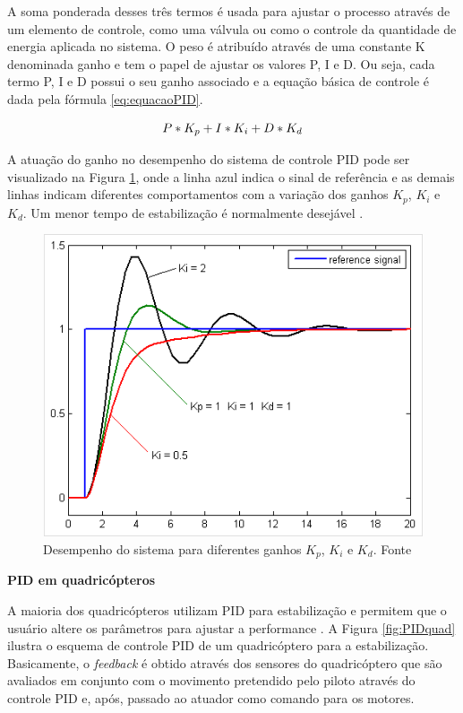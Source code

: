 \documentclass[a4paper, 12pt]{article}
\begin{document}
A soma ponderada desses três termos é usada para ajustar o processo através de um elemento de controle, como uma válvula ou como o controle da quantidade de energia aplicada no sistema. O peso é atribuído através de uma constante K denominada ganho e tem o papel de ajustar os valores P, I e D. Ou seja, cada termo P, I e D possui o seu ganho associado e a equação básica de controle é dada pela fórmula \ref{eq:equacaoPID}. 

\begin{equation}
	\centering
		P*K_p + I*K_i + D*K_d	
	\label{eq:equacaoPID}
\end{equation}

A atuação do ganho no desempenho do sistema de controle PID pode ser visualizado na Figura \ref{fig:ganhoPID}, onde a linha azul indica o sinal de referência e as demais linhas indicam diferentes comportamentos com a variação dos ganhos $K_p$, $K_i$ e $K_d$. Um menor tempo de estabilização é normalmente desejável \cite{Kingdom}.  

\begin{figure}[h]
	\centering
		\includegraphics[scale=0.5]{img/ganho_PID.png}
	\caption{Desempenho do sistema para diferentes ganhos $K_p$, $K_i$ e $K_d$. Fonte \cite{Kingdom}}
	\label{fig:ganhoPID}
\end{figure}
 
\noindent\textbf{PID em quadricópteros}

A maioria dos quadricópteros utilizam PID para estabilização e permitem que o usuário altere os parâmetros para ajustar a performance \cite{Liang}. A Figura \ref{fig:PIDquad} ilustra o esquema de controle PID de um quadricóptero para a estabilização. Basicamente, o \textit{feedback} é obtido através dos sensores do quadricóptero que são avaliados em conjunto com o movimento pretendido pelo piloto através do controle PID e, após, passado ao atuador como comando para os motores. 
\end{document}
